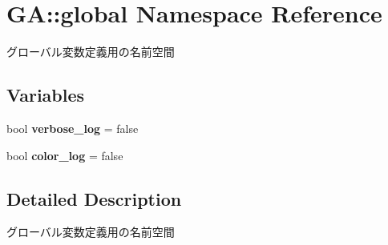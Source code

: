 \hypertarget{namespace_g_a_1_1global}{}\section{GA\+::global Namespace Reference}
\label{namespace_g_a_1_1global}


グローバル変数定義用の名前空間  


\subsection*{Variables}
\begin{DoxyCompactItemize}
\item 
\mbox{\label{namespace_g_a_1_1global_a503304ec81b99e760c6aea73e752b9ea}} 
bool {\bfseries verbose\+\_\+log} = false
\item 
\mbox{\label{namespace_g_a_1_1global_a2e9c3ac13444e92eff7f5925ca7e8d58}} 
bool {\bfseries color\+\_\+log} = false
\end{DoxyCompactItemize}


\subsection{Detailed Description}
グローバル変数定義用の名前空間 

